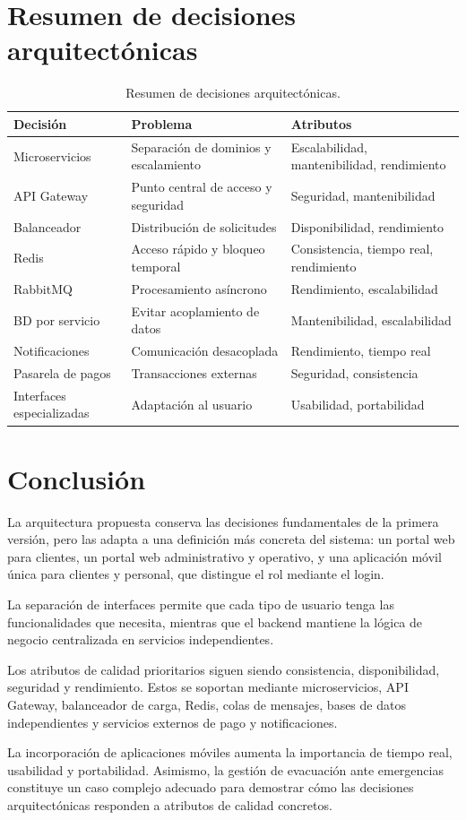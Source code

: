 \documentclass[12pt,a4paper]{article}
\begin{document}
\section{Resumen de decisiones arquitectónicas}

\begin{table}[H]
\centering
\small
\begin{tabular}{p{4cm}p{5cm}p{5cm}}
\toprule
\textbf{Decisión} & \textbf{Problema} & \textbf{Atributos}\\
\midrule
Microservicios & Separación de dominios y escalamiento & Escalabilidad, mantenibilidad, rendimiento\\
API Gateway & Punto central de acceso y seguridad & Seguridad, mantenibilidad\\
Balanceador & Distribución de solicitudes & Disponibilidad, rendimiento\\
Redis & Acceso rápido y bloqueo temporal & Consistencia, tiempo real, rendimiento\\
RabbitMQ & Procesamiento asíncrono & Rendimiento, escalabilidad\\
BD por servicio & Evitar acoplamiento de datos & Mantenibilidad, escalabilidad\\
Notificaciones & Comunicación desacoplada & Rendimiento, tiempo real\\
Pasarela de pagos & Transacciones externas & Seguridad, consistencia\\
Interfaces especializadas & Adaptación al usuario & Usabilidad, portabilidad\\
\bottomrule
\end{tabular}
\caption{Resumen de decisiones arquitectónicas.}
\end{table}

\section{Conclusión}

La arquitectura propuesta conserva las decisiones fundamentales de la primera versión, pero las adapta a una definición más concreta del sistema: un portal web para clientes, un portal web administrativo y operativo, y una aplicación móvil única para clientes y personal, que distingue el rol mediante el login.

La separación de interfaces permite que cada tipo de usuario tenga las funcionalidades que necesita, mientras que el backend mantiene la lógica de negocio centralizada en servicios independientes.

Los atributos de calidad prioritarios siguen siendo consistencia, disponibilidad, seguridad y rendimiento. Estos se soportan mediante microservicios, API Gateway, balanceador de carga, Redis, colas de mensajes, bases de datos independientes y servicios externos de pago y notificaciones.

La incorporación de aplicaciones móviles aumenta la importancia de tiempo real, usabilidad y portabilidad. Asimismo, la gestión de evacuación ante emergencias constituye un caso complejo adecuado para demostrar cómo las decisiones arquitectónicas responden a atributos de calidad concretos.
\end{document}

